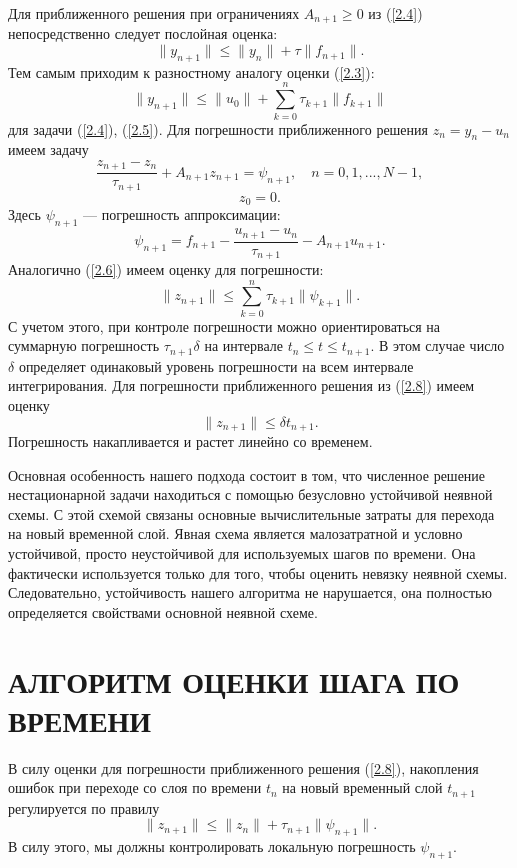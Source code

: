 \documentclass[12pt]{ncc}
\numberwithin{equation}{section}
\begin{document}
Для приближенного решения при ограничениях $A_{n+1} \geq 0$ из (\ref{2.4})
непосредственно следует послойная оценка:
\[
 \|y_{n+1}\| \leq \|y_{n}\| + \tau \|f_{n+1}\| .
\] 
Тем самым приходим к разностному аналогу оценки (\ref{2.3}):
\begin{equation}\label{2.6}
 \|y_{n+1}\| \leq \|u_{0}\| + \sum_{k=0}^{n} \tau_{k+1} \|f_{k+1}\| 
\end{equation} 
для задачи  (\ref{2.4}), (\ref{2.5}).
Для погрешности приближенного решения $z_n = y_n - u_n$ имеем задачу
\[
  \frac{z_{n+1} - z_{n}}{\tau_{n+1}} + A_{n+1} z_{n+1} = \psi_{n+1},
  \quad n = 0,1, ..., N-1,  
\] 
\[
 z_0 = 0.
\] 
Здесь $\psi_{n+1}$ --- погрешность аппроксимации:
\begin{equation}\label{2.7}
 \psi_{n+1} = f_{n+1} -
 \frac{u_{n+1} - u_{n}}{\tau_{n+1}} - A_{n+1} u_{n+1} . 
\end{equation} 
Аналогично (\ref{2.6}) имеем оценку для погрешности:
\begin{equation}\label{2.8}
  \|z_{n+1}\| \leq \sum_{k=0}^{n} \tau_{k+1} \|\psi_{k+1}\| .
\end{equation}  
С учетом этого, при контроле погрешности можно ориентироваться на суммарную погрешность
$\tau_{n+1} \delta$ на интервале $t_n \leq t \leq t_{n+1}$.
В этом случае число $\delta$ определяет одинаковый уровень погрешности на всем интервале интегрирования.
Для погрешности приближенного решения из (\ref{2.8}) имеем оценку
\[
 \|z_{n+1}\| \leq \delta t_{n+1}.
\] 
Погрешность накапливается и растет линейно со временем.


Основная особенность нашего подхода состоит в том, что 
численное решение нестационарной задачи находиться с 
помощью безусловно устойчивой неявной схемы. 
С этой схемой связаны основные вычислительные затраты
для перехода на новый временной слой. Явная  схема 
является малозатратной и  условно устойчивой, просто неустойчивой для 
используемых шагов по времени. Она
фактически используется только для того, чтобы оценить 
невязку неявной схемы. Следовательно, устойчивость нашего алгоритма
не нарушается, она полностью определяется свойствами основной неявной схеме.


\section{АЛГОРИТМ ОЦЕНКИ ШАГА ПО ВРЕМЕНИ} 

В силу оценки для погрешности приближенного решения (\ref{2.8}),
накопления ошибок при переходе со слоя по времени $t_n$ на новый временный слой 
$t_{n+1}$ регулируется по правилу
\[
   \|z_{n+1}\| \leq \|z_{n}\| + \tau_{n+1} \|\psi_{n+1}\| .
\] 
В силу этого, мы должны контролировать локальную погрешность $\psi_{n+1}$. 
\end{document}
